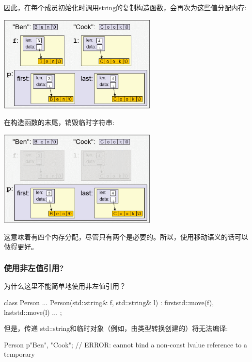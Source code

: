 因此，在每个成员初始化时调用string的复制构造函数，会再次为这些值分配内存:

\begin{center}
	\includegraphics[width=0.6\textwidth]{part1/ch4/images/2}
\end{center}

在构造函数的末尾，销毁临时字符串:

\begin{center}
	\includegraphics[width=0.6\textwidth]{part1/ch4/images/3}
\end{center}

这意味着有四个内存分配，尽管只有两个是必要的。所以，使用移动语义的话可以做得更好。

\subsubsection{使用非左值引用?}

为什么这里不能简单地使用非左值引用？

\begin{cppcode}
class Person {
	...
	Person(std::string& f, std::string& l)
	: first{std::move(f)}, last{std::move(l)} {
	}
	...
};
\end{cppcode}

但是，传递 std::string和临时对象（例如，由类型转换创建的）将无法编译:

\begin{cppcode}
Person p{"Ben", "Cook"}; // ERROR: cannot bind a non-const lvalue reference to a temporary
\end{cppcode}

